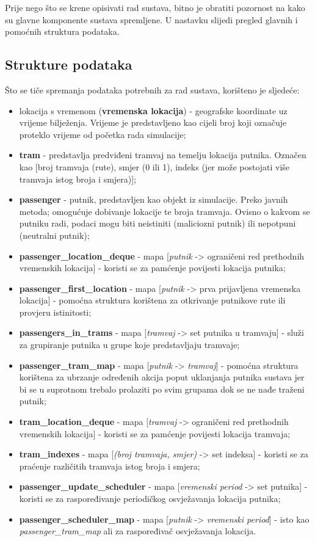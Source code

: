 \documentclass[times, utf8, diplomski]{fer}
\begin{document}
Prije nego što se krene opisivati rad sustava, bitno je obratiti pozornost na kako su glavne komponente sustava spremljene. U nastavku slijedi pregled glavnih i pomoćnih struktura podataka.

\subsection{Strukture podataka}
Što se tiče spremanja podataka potrebnih za rad sustava, korišteno je sljedeće:
\begin{itemize}
    \item lokacija s vremenom (\textbf{vremenska lokacija}) - geografske koordinate uz vrijeme bilježenja. Vrijeme je predstavljeno kao cijeli broj koji označuje proteklo vrijeme od početka rada simulacije;
    \item \textbf{tram} - predstavlja predviđeni tramvaj na temelju lokacija putnika. Označen kao [broj tramvaja (rute), smjer (0 ili 1), indeks (jer može postojati više tramvaja istog broja i smjera)];
    \item \textbf{passenger} - putnik, predstavljen kao objekt iz simulacije. Preko javnih metoda; omogućuje dobivanje lokacije te broja tramvaja. Ovisno o kakvom se putniku radi, podaci mogu biti neistiniti (maliciozni putnik) ili nepotpuni (neutralni putnik);
    \item \textbf{passenger\_location\_deque} - mapa [\emph{putnik} -> ograničeni red prethodnih vremenskih lokacija] - koristi se za pamćenje povijesti lokacija putnika;
    \item \textbf{passenger\_first\_location} - mapa [\emph{putnik} -> prva prijavljena vremenska lokacija] - pomoćna struktura korištena za otkrivanje putnikove rute ili provjeru istinitosti;
    \item \textbf{passengers\_in\_trams} - mapa [\emph{tramvaj} -> set putnika u tramvaju] - služi za grupiranje putnika u grupe koje predstavljaju tramvaje;
    \item \textbf{passenger\_tram\_map} - mapa [\emph{putnik} -> \emph{tramvaj}] - pomoćna struktura korištena za ubrzanje određenih akcija poput uklanjanja putnika sustava jer bi se u suprotnom trebalo prolaziti po svim grupama dok se ne nađe traženi putnik;
    \item \textbf{tram\_location\_deque} - mapa [\emph{tramvaj} -> ograničeni red prethodnih vremenskih lokacija] - koristi se za pamćenje povijesti lokacija tramvaja;
    \item \textbf{tram\_indexes} - mapa [\emph{(broj tramvaja, smjer)} -> set indeksa] - koristi se za praćenje različitih tramvaja istog broja i smjera;
    \item \textbf{passenger\_update\_scheduler} - mapa [\emph{vremenski period} -> set putnika] - koristi se za raspoređivanje periodičkog osvježavanja lokacija putnika;
    \item \textbf{passenger\_scheduler\_map} - mapa [\emph{putnik} -> \emph{vremenski period}] - isto kao \emph{passenger\_tram\_map} ali za raspoređivač osvježavanja lokacija.
\end{itemize}
\end{document}

